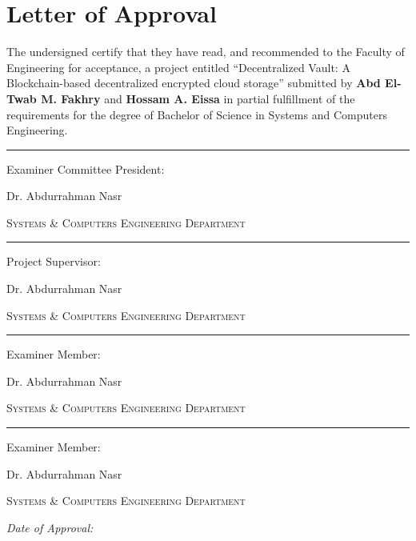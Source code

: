 \chapter*{Letter of Approval}

The undersigned certify that they have read, and recommended to the Faculty of Engineering for acceptance, a project entitled ``Decentralized Vault: A Blockchain-based decentralized encrypted cloud storage'' submitted by \textbf{Abd El-Twab M. Fakhry} and \textbf{Hossam A. Eissa} in partial fulfillment of the requirements for the degree of Bachelor of Science in Systems and Computers Engineering.\vspace{2cm}

\begin{multicols}{2}
  \begin{flushleft}
    \par\noindent\rule{0.45\textwidth}{0.4pt}\par
    Examiner Committee President:\par
    Dr. Abdurrahman Nasr\par
    \small
    \scshape
    Systems \& Computers Engineering Department\par
  \end{flushleft}

  \begin{flushleft}
    \par\noindent\rule{0.45\textwidth}{0.4pt}\par
    Project Supervisor:\par
    Dr. Abdurrahman Nasr\par
    \small
    \scshape
    Systems \& Computers Engineering Department\par
  \end{flushleft}
\end{multicols}

\vspace{1cm}

\begin{multicols}{2}
  \begin{flushleft}
    \par\noindent\rule{0.45\textwidth}{0.4pt}\par
    Examiner Member:\par
    Dr. Abdurrahman Nasr\par
    \small
    \scshape
    Systems \& Computers Engineering Department\par
  \end{flushleft}

  \begin{flushleft}
    \par\noindent\rule{0.45\textwidth}{0.4pt}\par
    Examiner Member:\par
    Dr. Abdurrahman Nasr\par
    \small
    \scshape
    Systems \& Computers Engineering Department\par
  \end{flushleft}
\end{multicols}

\vspace{3cm}
{
  \Large
  \textsl{Date of Approval:}
}